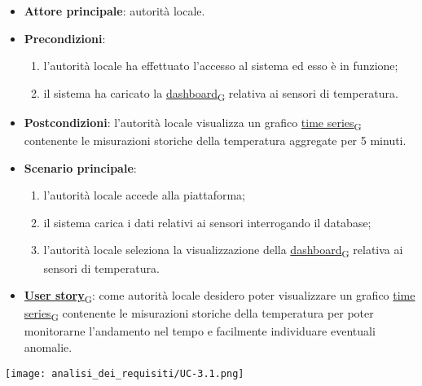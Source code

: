 \begin{itemize}
	\item \textbf{Attore principale}: autorità locale.
	\item \textbf{Precondizioni}:
	      \begin{enumerate}
		      \item l'autorità locale ha effettuato l'accesso al sistema ed esso è in funzione;
		      \item il sistema ha caricato la \href{https://7last.github.io/docs/rtb/documentazione-interna/glossario\#dashboard}{dashboard\textsubscript{G}} relativa ai sensori di temperatura.
	      \end{enumerate}
	\item \textbf{Postcondizioni}: l'autorità locale visualizza un grafico \href{https://7last.github.io/docs/rtb/documentazione-interna/glossario\#time-series}{time series\textsubscript{G}} contenente le misurazioni storiche
	      della temperatura aggregate per 5 minuti.
	\item \textbf{Scenario principale}:
	      \begin{enumerate}
		      \item l'autorità locale accede alla piattaforma;
		      \item il sistema carica i dati relativi ai sensori interrogando il database;
		      \item l'autorità locale seleziona la visualizzazione della \href{https://7last.github.io/docs/rtb/documentazione-interna/glossario\#dashboard}{dashboard\textsubscript{G}} relativa ai sensori di temperatura.
	      \end{enumerate}
	\item \href{https://7last.github.io/docs/rtb/documentazione-interna/glossario\#user-story}{\textbf{User story}\textsubscript{G}}: come autorità locale desidero poter visualizzare un grafico \href{https://7last.github.io/docs/rtb/documentazione-interna/glossario\#time-series}{time series\textsubscript{G}} contenente le misurazioni storiche della temperatura
	      per poter monitorarne l'andamento nel tempo e facilmente individuare eventuali anomalie.
\end{itemize}
\begin{center}
	\texttt{[image: analisi\_dei\_requisiti/UC-3.1.png]}
\end{center}

